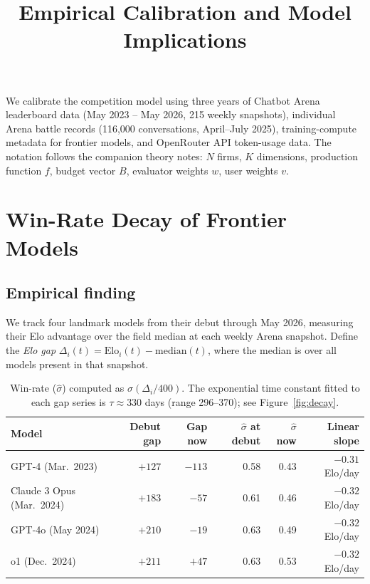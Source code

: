 \documentclass{article}
\title{Empirical Calibration and Model Implications}
\date{}
\theoremstyle{definition}
\begin{document}
\maketitle

\noindent We calibrate the competition model using three years of Chatbot Arena
leaderboard data (May 2023 -- May 2026, 215 weekly snapshots), individual
Arena battle records (116{,}000 conversations, April--July 2025), training-compute
metadata for frontier models, and OpenRouter API token-usage data.
The notation follows the companion theory notes: $N$ firms, $K$ dimensions,
production function $f$, budget vector $B$, evaluator weights $w$, user
weights $v$.

\section{Win-Rate Decay of Frontier Models}

\subsection*{Empirical finding}

We track four landmark models from their debut through May 2026, measuring
their Elo advantage over the field median at each weekly Arena snapshot.
Define the \emph{Elo gap} $\Delta_i(t) = \text{Elo}_i(t) - \text{median}(t)$,
where the median is over all models present in that snapshot.

\begin{table}[h]
\centering
\begin{tabular}{lrrrrr}
\toprule
Model & Debut gap & Gap now & $\hat\sigma$ at debut & $\hat\sigma$ now
      & Linear slope \\
\midrule
GPT-4 (Mar.\ 2023)         & $+127$ & $-113$ & 0.58 & 0.43 & $-0.31$ Elo/day \\
Claude 3 Opus (Mar.\ 2024) & $+183$ & $ -57$ & 0.61 & 0.46 & $-0.32$ Elo/day \\
GPT-4o (May 2024)          & $+210$ & $ -19$ & 0.63 & 0.49 & $-0.32$ Elo/day \\
o1 (Dec.\ 2024)            & $+211$ & $+47$ & 0.63 & 0.53 & $-0.32$ Elo/day \\
\bottomrule
\end{tabular}
\caption{Win-rate ($\hat\sigma$) computed as $\sigma(\Delta_i/400)$.
The exponential time constant fitted to each gap series is $\tau \approx 330$
days (range 296--370); see Figure~\ref{fig:decay}.}
\label{tab:decay}
\end{table}
\end{document}
